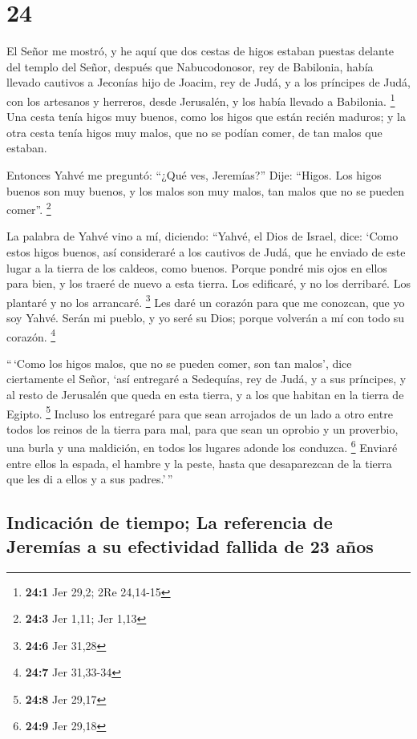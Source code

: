\hypertarget{section-23}{%
\section{24}\label{section-23}}

 El Señor me mostró, y he aquí que dos cestas de higos
estaban puestas delante del templo del Señor, después que Nabucodonosor,
rey de Babilonia, había llevado cautivos a Jeconías hijo de Joacim, rey
de Judá, y a los príncipes de Judá, con los artesanos y herreros, desde
Jerusalén, y los había llevado a Babilonia. \footnote{\textbf{24:1} Jer
  29,2; 2Re 24,14-15}  Una cesta tenía higos muy buenos,
como los higos que están recién maduros; y la otra cesta tenía higos muy
malos, que no se podían comer, de tan malos que estaban.

 Entonces Yahvé me preguntó: ``¿Qué ves, Jeremías?'' Dije:
``Higos. Los higos buenos son muy buenos, y los malos son muy malos, tan
malos que no se pueden comer''. \footnote{\textbf{24:3} Jer 1,11; Jer
  1,13}

 La palabra de Yahvé vino a mí, diciendo: 
``Yahvé, el Dios de Israel, dice: `Como estos higos buenos, así
consideraré a los cautivos de Judá, que he enviado de este lugar a la
tierra de los caldeos, como buenos.  Porque pondré mis
ojos en ellos para bien, y los traeré de nuevo a esta tierra. Los
edificaré, y no los derribaré. Los plantaré y no los arrancaré.
\footnote{\textbf{24:6} Jer 31,28}  Les daré un corazón
para que me conozcan, que yo soy Yahvé. Serán mi pueblo, y yo seré su
Dios; porque volverán a mí con todo su corazón. \footnote{\textbf{24:7}
  Jer 31,33-34}

 ``\,`Como los higos malos, que no se pueden comer, son
tan malos', dice ciertamente el Señor, `así entregaré a Sedequías, rey
de Judá, y a sus príncipes, y al resto de Jerusalén que queda en esta
tierra, y a los que habitan en la tierra de Egipto. \footnote{\textbf{24:8}
  Jer 29,17}  Incluso los entregaré para que sean
arrojados de un lado a otro entre todos los reinos de la tierra para
mal, para que sean un oprobio y un proverbio, una burla y una maldición,
en todos los lugares adonde los conduzca. \footnote{\textbf{24:9} Jer
  29,18}  Enviaré entre ellos la espada, el hambre y la
peste, hasta que desaparezcan de la tierra que les di a ellos y a sus
padres.'\,''

\hypertarget{indicaciuxf3n-de-tiempo-la-referencia-de-jeremuxedas-a-su-efectividad-fallida-de-23-auxf1os}{%
\subsection{Indicación de tiempo; La referencia de Jeremías a su
efectividad fallida de 23
años}\label{indicaciuxf3n-de-tiempo-la-referencia-de-jeremuxedas-a-su-efectividad-fallida-de-23-auxf1os}}

